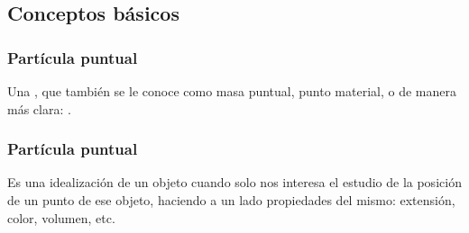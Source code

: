 \documentclass[12pt]{beamer}
\begin{document}
\subsection{Conceptos básicos}

\begin{frame}
\frametitle{Partícula puntual}
Una , que también se le conoce como masa puntual, punto material, o de manera más clara: .
\end{frame}
\begin{frame}
\frametitle{Partícula puntual}
Es una idealización de un objeto cuando solo nos interesa el estudio de la posición de un punto de ese objeto, haciendo a un lado propiedades del mismo: extensión, color, volumen, etc.
\end{frame}
\end{document}
